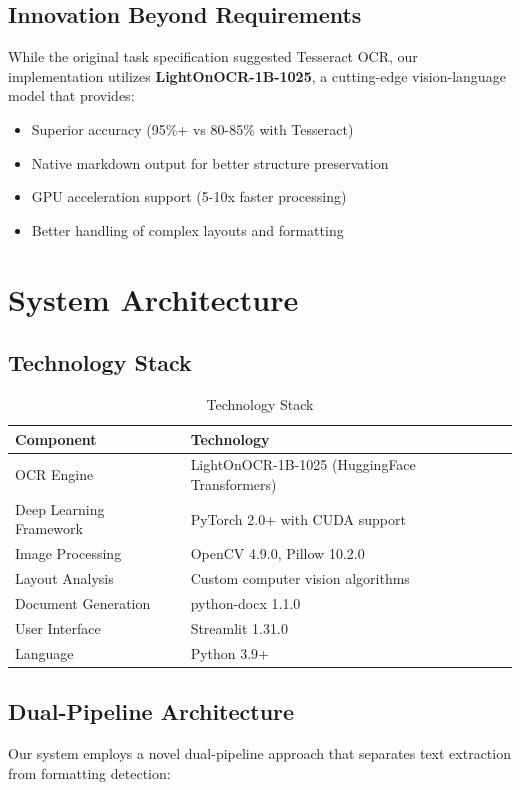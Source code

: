 \documentclass[12pt,a4paper]{article}
\begin{document}
\subsection{Innovation Beyond Requirements}
While the original task specification suggested Tesseract OCR, our implementation utilizes \textbf{LightOnOCR-1B-1025}, a cutting-edge vision-language model that provides:
\begin{itemize}[noitemsep]
    \item Superior accuracy (95\%+ vs 80-85\% with Tesseract)
    \item Native markdown output for better structure preservation
    \item GPU acceleration support (5-10x faster processing)
    \item Better handling of complex layouts and formatting
\end{itemize}

\newpage

\section{System Architecture}

\subsection{Technology Stack}
\begin{table}[h]
\centering
\begin{tabular}{@{}ll@{}}
\toprule
\textbf{Component} & \textbf{Technology} \\ \midrule
OCR Engine & LightOnOCR-1B-1025 (HuggingFace Transformers) \\
Deep Learning Framework & PyTorch 2.0+ with CUDA support \\
Image Processing & OpenCV 4.9.0, Pillow 10.2.0 \\
Layout Analysis & Custom computer vision algorithms \\
Document Generation & python-docx 1.1.0 \\
User Interface & Streamlit 1.31.0 \\
Language & Python 3.9+ \\ \bottomrule
\end{tabular}
\caption{Technology Stack}
\end{table}

\subsection{Dual-Pipeline Architecture}
Our system employs a novel dual-pipeline approach that separates text extraction from formatting detection:
\end{document}
